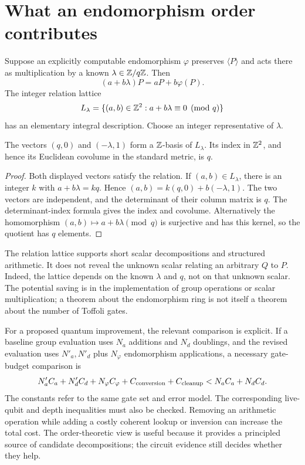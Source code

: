 \section{What an endomorphism order contributes}
Suppose an explicitly computable endomorphism $\varphi$ preserves $\langle P\rangle$ and acts there as multiplication by a known $\lambda\in\mathbb{Z}/q\mathbb{Z}$. Then
\[
 (a+b\lambda)P=aP+b\varphi(P).
\]
The integer relation lattice
\[
 L_\lambda=\{(a,b)\in\mathbb{Z}^2:a+b\lambda\equiv0\pmod q\}
\]
has an elementary integral description. Choose an integer representative of $\lambda$.

\begin{proposition}
The vectors $(q,0)$ and $(-\lambda,1)$ form a $\mathbb{Z}$-basis of $L_\lambda$. Its index in $\mathbb{Z}^2$, and hence its Euclidean covolume in the standard metric, is $q$.
\end{proposition}
\begin{proof}
Both displayed vectors satisfy the relation. If $(a,b)\in L_\lambda$, there is an integer $k$ with $a+b\lambda=kq$. Hence
$(a,b)=k(q,0)+b(-\lambda,1)$.
The two vectors are independent, and the determinant of their column matrix is $q$. The determinant-index formula gives the index and covolume. Alternatively the homomorphism $(a,b)\mapsto a+b\lambda\pmod q$ is surjective and has this kernel, so the quotient has $q$ elements.
\end{proof}

The relation lattice supports short scalar decompositions and structured arithmetic. It does not reveal the unknown scalar relating an arbitrary $Q$ to $P$. Indeed, the lattice depends on the known $\lambda$ and $q$, not on that unknown scalar. The potential saving is in the implementation of group operations or scalar multiplication; a theorem about the endomorphism ring is not itself a theorem about the number of Toffoli gates.

For a proposed quantum improvement, the relevant comparison is explicit. If a baseline group evaluation uses $N_a$ additions and $N_d$ doublings, and the revised evaluation uses $N'_a,N'_d$ plus $N_\varphi$ endomorphism applications, a necessary gate-budget comparison is
\[
 N'_a C_a+N'_d C_d+N_\varphi C_\varphi+C_{\rm conversion}+C_{\rm cleanup}
 <N_aC_a+N_dC_d.
\]
The constants refer to the same gate set and error model. The corresponding live-qubit and depth inequalities must also be checked. Removing an arithmetic operation while adding a costly coherent lookup or inversion can increase the total cost. The order-theoretic view is useful because it provides a principled source of candidate decompositions; the circuit evidence still decides whether they help.

